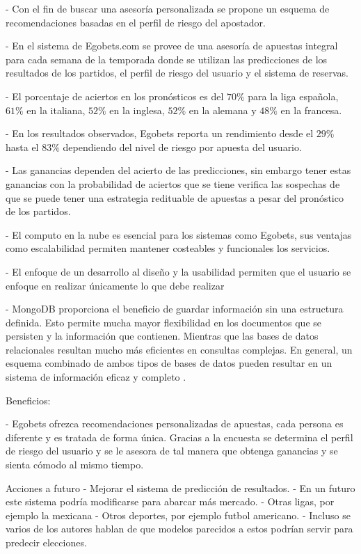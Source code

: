 - Con el fin de buscar una asesoría personalizada se propone un esquema de recomendaciones basadas en el perfil de riesgo del apostador.

- En el sistema de Egobets.com se provee de una asesoría de apuestas integral para cada semana de la temporada donde se utilizan las predicciones de los resultados de los partidos, el perfil de riesgo del usuario y el sistema de reservas.


- El porcentaje de aciertos en los pronósticos es del $70\%$ para la liga española, $61\%$ en la italiana, $52\%$ en la inglesa, $52\%$ en la alemana y $48\%$ en la francesa.


- En los resultados observados, Egobets reporta un rendimiento desde el $29\%$ hasta el $83\%$ dependiendo del nivel de riesgo por apuesta del usuario.

- Las ganancias dependen del acierto de las predicciones, sin embargo tener estas ganancias con la probabilidad de aciertos que se tiene verifica las sospechas de que se puede tener una estrategia redituable de apuestas a pesar del pronóstico de los partidos.

- El computo en la nube es esencial para los sistemas como Egobets, sus ventajas como escalabilidad permiten mantener costeables y funcionales los servicios.

- El enfoque de un desarrollo al diseño y la usabilidad permiten que el usuario se enfoque en realizar únicamente lo que debe realizar 

- MongoDB proporciona el beneficio de guardar información sin una estructura definida. Esto permite mucha mayor flexibilidad en los documentos que se persisten y la información que contienen\cite{puniaimplementing}. Mientras que las bases de datos relacionales resultan mucho más eficientes en consultas complejas. En general, un esquema combinado de ambos tipos de bases de datos pueden resultar en un sistema de información eficaz y completo \cite{faraj2014comparative}.


Beneficios:

- Egobets ofrezca recomendaciones personalizadas de apuestas, cada persona es diferente y es tratada de forma única. Gracias a la encuesta se determina el perfil de riesgo del usuario y se le asesora de tal manera que obtenga ganancias y se sienta cómodo  al mismo tiempo.


Acciones a futuro
- Mejorar el sistema de predicción de resultados.
- En un futuro este sistema podría modificarse para abarcar más mercado.
	- Otras ligas, por ejemplo la mexicana
	- Otros deportes, por ejemplo futbol americano.
- Incluso se varios de los autores hablan de que modelos parecidos a estos podrían servir para predecir elecciones.


